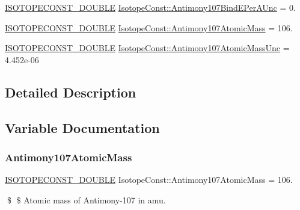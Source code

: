 \begin{DoxyCompactItemize}
\mbox{\hyperlink{group___isotope_const-_macros_ga8f45a7272ce02c0b4c65c44636ed719a}{I\+S\+O\+T\+O\+P\+E\+C\+O\+N\+S\+T\+\_\+\+D\+O\+U\+B\+LE}} \mbox{\hyperlink{group___isotope_const-_antimony-_sb107_gaad001354cb264b2c189d103c9556c99a}{Isotope\+Const\+::\+Antimony107\+Bind\+E\+Per\+A\+Unc}} = 0.
\item 
\mbox{\hyperlink{group___isotope_const-_macros_ga8f45a7272ce02c0b4c65c44636ed719a}{I\+S\+O\+T\+O\+P\+E\+C\+O\+N\+S\+T\+\_\+\+D\+O\+U\+B\+LE}} \mbox{\hyperlink{group___isotope_const-_antimony-_sb107_gad26df27fae94974e6b5b0f83db35c1ee}{Isotope\+Const\+::\+Antimony107\+Atomic\+Mass}} = 106.
\item 
\mbox{\hyperlink{group___isotope_const-_macros_ga8f45a7272ce02c0b4c65c44636ed719a}{I\+S\+O\+T\+O\+P\+E\+C\+O\+N\+S\+T\+\_\+\+D\+O\+U\+B\+LE}} \mbox{\hyperlink{group___isotope_const-_antimony-_sb107_ga7b3859ce369a31e6e0453584712c6435}{Isotope\+Const\+::\+Antimony107\+Atomic\+Mass\+Unc}} = 4.\+452e-\/06
\end{DoxyCompactItemize}


\subsection{Detailed Description}


\subsection{Variable Documentation}
\mbox{\label{group___isotope_const-_antimony-_sb107_gad26df27fae94974e6b5b0f83db35c1ee}} 
\subsubsection{\texorpdfstring{Antimony107\+Atomic\+Mass}{Antimony107AtomicMass}}
{\footnotesize\ttfamily \mbox{\hyperlink{group___isotope_const-_macros_ga8f45a7272ce02c0b4c65c44636ed719a}{I\+S\+O\+T\+O\+P\+E\+C\+O\+N\+S\+T\+\_\+\+D\+O\+U\+B\+LE}} Isotope\+Const\+::\+Antimony107\+Atomic\+Mass = 106.}

\$ \$ Atomic mass of Antimony-\/107 in amu. \mbox{\label{group___isotope_const-_antimony-_sb107_ga7b3859ce369a31e6e0453584712c6435}} 
